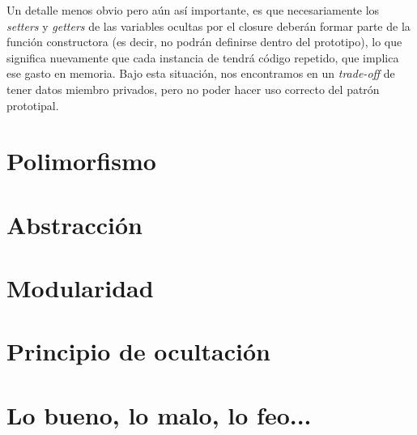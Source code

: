 Un detalle menos obvio pero aún así importante, es que necesariamente los \textit{setters} y \textit{getters} de las variables ocultas por el closure deberán formar parte de la función constructora (es decir, no podrán definirse dentro del prototipo), lo que significa nuevamente que cada instancia de  tendrá código repetido, que implica ese gasto en memoria. Bajo esta situación, nos encontramos en un \textit{trade-off} de tener datos miembro privados, pero no poder hacer uso correcto del patrón prototipal.

\section{Polimorfismo}

\section{Abstracción}

\section{Modularidad}

\section{Principio de ocultación}

\section{Lo bueno, lo malo, lo feo...}
